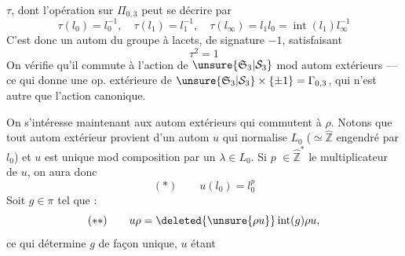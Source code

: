 $\tau$, dont l'opération sur $\Pi_{0,3}$ peut se décrire par
\[
\tau(l_0)=l_0^{-1},\quad\tau(l_1)=l_1^{-1},\quad\tau(l_\infty)=l_1l_0=\operatorname{int}(l_1)l_\infty^{-1}
\]
C'est donc un autom du groupe à lacets, de signature $-1$, satisfaisant
\[
\tau^2=1
\]
On vérifie qu'il commute à l'action de $\unsure{\mathfrak S_3|\mathcal S_3}$ mod autom extérieurs --- ce qui donne une op. extérieure de $\unsure{\mathfrak S_3|\mathcal S_3}\times\{\pm1\}=\Gamma_{0,3}$, qui n'est autre que l'action canonique.

On s'intéresse maintenant aux autom extérieurs qui commutent à $\rho$. Notons que tout autom extérieur  provient d'un autom $u$ qui normalise  $L_0$ ($\simeq\hat{\mathbb Z}$ engendré par $l_0$) et $u$ est unique mod composition par un $\lambda\in L_0$. Si $p$  $\in\hat{\mathbb Z}^{*}$  le multiplicateur de $u$, on aura donc
\[
(*)\qquad u(l_0)=l_0^p
\]
Soit $g\in\pi$ tel que :
\[
(**)\qquad u\rho=\deleted{\unsure{\rho u}}\operatorname{int}(g)\rho u,
\]
ce qui détermine $g$ de façon unique, $u$ étant
